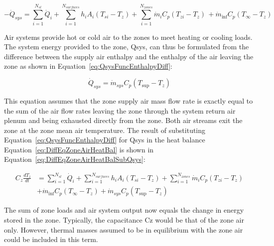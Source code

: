 \begin{equation}
- {\dot Q_{sys}} = \sum\limits_{i = 1}^{{N_{sl}}} {{{\dot Q}_i}}  + \sum\limits_{i = 1}^{{N_{surfaces}}} {{h_i}} {A_i}\left( {{T_{si}} - {T_z}} \right) + \sum\limits_{i = 1}^{{N_{zones}}} {{{\dot m}_i}} {C_p}\left( {{T_{zi}} - {T_z}} \right)\, + {\dot m_{\inf }}{C_p}\left( {{T_\infty } - {T_z}} \right)
\label{eq:SteadyStateSystemOutput}
\end{equation}

Air systems provide hot or cold air to the zones to meet heating or cooling loads. The system energy provided to the zone, Qsys, can thus be formulated from the difference between the supply air enthalpy and the enthalpy of the air leaving the zone as shown in Equation~\ref{eq:QsysFuncEnthalpyDiff}:

\begin{equation}
{\dot Q_{sys}} = {\dot m_{sys}}{C_p}\left( {{T_{\sup }} - {T_z}} \right)
\label{eq:QsysFuncEnthalpyDiff}
\end{equation}

This equation assumes that the zone supply air mass flow rate is exactly equal to the sum of the air flow rates leaving the zone through the system return air plenum and being exhausted directly from the zone. Both air streams exit the zone at the zone mean air temperature. The result of substituting Equation~\ref{eq:QsysFuncEnthalpyDiff} for Qsys in the heat balance Equation~\ref{eq:DiffEqZoneAirHeatBal} is shown in Equation~\ref{eq:DiffEqZoneAirHeatBalSubQsys}:

\begin{equation}
\begin{array}{ll}
    {C_z}\frac{{d{T_z}}}{{dt}} & = \sum\limits_{i = 1}^{{N_{sl}}} {{{\dot Q}_i}}  + \sum\limits_{i = 1}^{{N_{surfaces}}} {{h_i}} {A_i}\left( {{T_{si}} - {T_z}} \right) + \sum\limits_{i = 1}^{{N_{zones}}} {{{\dot m}_i}} {C_p}\left( {{T_{zi}} - {T_z}} \right) \\
                               &+ {{\dot m}_{\inf }}{C_p}\left( {{T_\infty } - {T_z}} \right) + {{\dot m}_{sys}}{C_p}\left( {{T_{\sup }} - {T_z}} \right)
  \end{array}
\label{eq:DiffEqZoneAirHeatBalSubQsys}
\end{equation}

The sum of zone loads and air system output now equals the change in energy stored in the zone. Typically, the capacitance Cz would be that of the zone air only. However, thermal masses assumed to be in equilibrium with the zone air could be included in this term.

